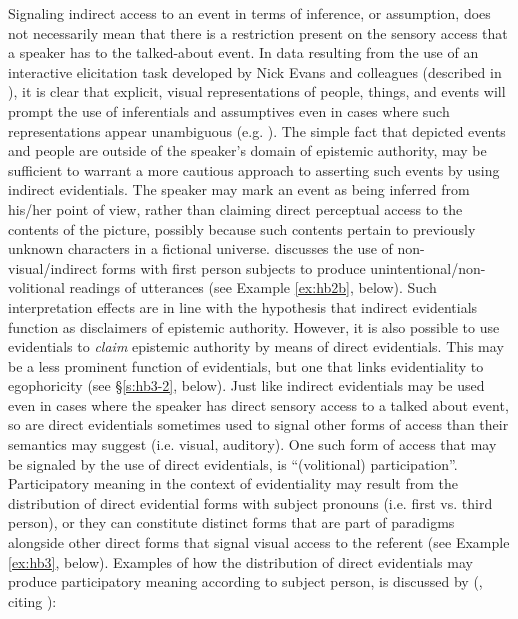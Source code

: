 \documentclass[output=paper]{langsci/langscibook}
\begin{document}
Signaling indirect access to an event in terms of inference, or assumption, does not necessarily mean that there is a restriction present on the sensory access that a speaker has to the talked-about event. In data resulting from the use of an interactive elicitation task developed by Nick Evans and colleagues (described in \citealt{SanRoqueetal2012}), it is clear that explicit, visual representations of people, things, and events will prompt the use of inferentials and assumptives even in cases where such representations appear unambiguous (e.g. \citealt{Quartararo2017}). The simple fact that depicted events and people are outside of the speaker’s domain of epistemic authority, may be sufficient to warrant a more cautious approach to asserting such events by using indirect evidentials. The speaker may mark an event as being inferred from his/her point of view, rather than claiming direct perceptual access to the contents of the picture, possibly because such contents pertain to previously unknown characters in a fictional universe. 
\cite{Curnow2003} discusses the use of non-visual/indirect forms with first person subjects to produce unintentional/non-volitional readings of utterances (see Example \ref{ex:hb2b}, below). Such interpretation effects are in line with the hypothesis that indirect evidentials function as disclaimers of epistemic authority. However, it is also possible to use evidentials to \emph{claim} epistemic authority by means of direct evidentials. This may be a less prominent function of evidentials, but one that links evidentiality to egophoricity (see §\ref{s:hb3-2}, below). Just like indirect evidentials may be used even in cases where the speaker has direct sensory access to a talked about event, so are direct evidentials sometimes used to signal other forms of access than their semantics may suggest (i.e. visual, auditory). One such form of access that may be signaled by the use of direct evidentials, is “(volitional) participation”. Participatory meaning in the context of evidentiality may result from the distribution of direct evidential forms with subject pronouns (i.e. first vs. third person), or they can constitute distinct forms that are part of paradigms alongside other direct forms that signal visual access to the referent (see Example \ref{ex:hb3}, below). Examples of how the distribution of direct evidentials may produce participatory meaning according to subject person, is discussed by \citeauthor{Curnow2002b} (\citeyear[188--190]{Curnow2002b}, citing \citealt[133]{Ramirez1997}): 
\end{document}

